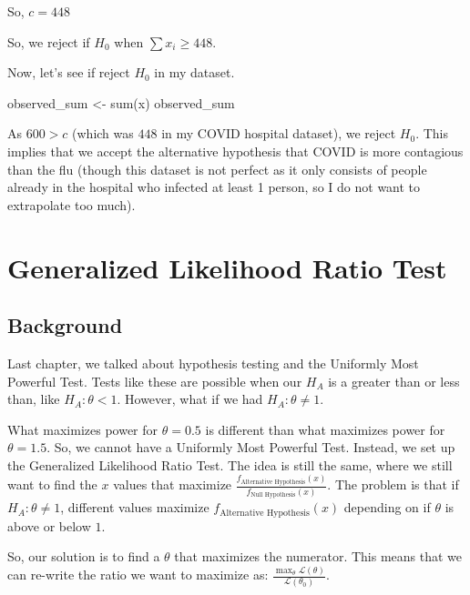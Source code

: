 \documentclass[
  letterpaper,
  DIV=11,
  numbers=noendperiod]{scrreprt}
\newenvironment{Shaded}{\begin{snugshade}}{\end{snugshade}}
\newcommand{\NormalTok}[1]{\textcolor[rgb]{0.00,0.23,0.31}{#1}}
\begin{document}
So, \(c = 448\)

So, we reject if \(H_0\) when \(\sum x_i \ge 448\).

Now, let's see if reject \(H_0\) in my dataset.

\begin{Shaded}
\begin{Highlighting}[]
\NormalTok{observed\_sum \textless{}{-} sum(x)}
\NormalTok{observed\_sum}
\end{Highlighting}
\end{Shaded}

As \(600 > c\) (which was \(448\) in my COVID hospital dataset), we
reject \(H_0\). This implies that we accept the alternative hypothesis
that COVID is more contagious than the flu (though this dataset is not
perfect as it only consists of people already in the hospital who
infected at least 1 person, so I do not want to extrapolate too much).


\chapter{Generalized Likelihood Ratio
Test}\label{generalized-likelihood-ratio-test}

\section{Background}\label{background-7}

Last chapter, we talked about hypothesis testing and the Uniformly Most
Powerful Test. Tests like these are possible when our \(H_A\) is a
greater than or less than, like \(H_A: \theta < 1\). However, what if we
had \(H_A: \theta \neq 1\).

What maximizes power for \(\theta = 0.5\) is different than what
maximizes power for \(\theta = 1.5\). So, we cannot have a Uniformly
Most Powerful Test. Instead, we set up the Generalized Likelihood Ratio
Test. The idea is still the same, where we still want to find the \(x\)
values that maximize
\(\frac{f_{\text{Alternative Hypothesis}}(x)}{f_{\text{Null Hypothesis}}(x)}\).
The problem is that if \(H_A: \theta \neq 1\), different values maximize
\(f_\text{Alternative Hypothesis}(x)\) depending on if \(\theta\) is
above or below \(1\).

So, our solution is to find a \(\theta\) that maximizes the numerator.
This means that we can re-write the ratio we want to maximize as:
\(\frac{\max_\theta \mathcal{L}(\theta)}{\mathcal{L}(\theta_0)}\).
\end{document}

